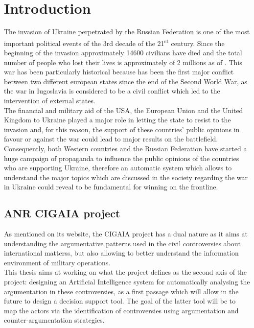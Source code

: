 \chapter{Introduction}
The invasion of Ukraine perpetrated by the Russian Federation is one of the most important political events of the 3rd decade of the 21\textsuperscript{st} century. Since the beginning
of the invasion approximately 14600 civilians have died and the total number of people who lost their lives is approximately of 2 millions as of \textcite{jonesrussia}. This war has been particularly historical
because has been
the first major conflict between two different european states since the end of the Second World War,
 as the war in Iugoslavia is considered to be a civil conflict which led to the intervention of external states.\\
The financial and military aid of the USA, the European Union and the United Kingdom to Ukraine played a major role in 
letting the state to resist to the invasion and, for this reason,
the support of these countries' public opinions in favour or against the war could lead to major results on the battlefield. 
Consequently, both Western countries and the 
Russian Federation have started a huge campaign of propaganda to influence the public opinions of the countries who are supporting Ukraine, therefore an automatic system
which allows to understand the major topics which are discussed in the society regarding the war 
in Ukraine could reveal to be fundamental for winning on the frontline.
\section{ANR CIGAIA project}
As mentioned on its website, the CIGAIA project has a dual nature as it aims at understanding the argumentative patterns
used in the civil controversies about international matterss, but also allowing to better understand the information environment 
of military operations.\\
This thesis aims at working on what the project defines as the second axis of the project: designing an Artificial Intelligence system
for automatically analysing the argumentation in these controversies, as a first passage which will allow in the future 
to design a decision support tool. The goal of the latter tool will be to map the actors via the identification of controversies
using argumentation and counter-argumentation strategies.
